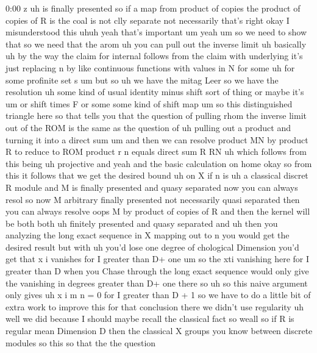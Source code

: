 \begin{unfinished}{0:00}
z
uh  is  finally
presented  so  if
a  map  from  product  of  copies  the  product
of  copies  of  R  is  the  coal  is  not  clly
separate  not  necessarily  that's  right
okay  I  misunderstood  this  uhuh  yeah
that's  important  um
yeah
um  so  we  need  to  show  that  so  we  need
that  the
arom  uh  you  can  pull  out  the  inverse
limit  uh  basically  uh  by  the  way  the
claim  for  internal  follows  from  the
claim  with  underlying  it's  just
replacing  n  by  like  continuous  functions
with  values  in  N  for
some  uh  for  some  profinite  set  s  um  but
so  uh  we  have  the  mitag  Leer  so  we  have
the
resolution
uh  some  kind  of  usual  identity  minus
shift  sort  of  thing  or  maybe
it's  um  or  shift  times  F  or  some  some
kind  of  shift  map  um  so  this
distinguished  triangle  here  so  that
tells  you  that  the  question  of  pulling
rhom  the  inverse  limit  out  of  the  ROM  is
the  same  as  the  question  of  uh  pulling
out  a  product  and  turning  it  into  a
direct  sum  um  and  then  we  can
resolve  product  MN  by  product
R  to
reduce  to
ROM  product  r  n  equals  direct  sum
R
RN  uh  which  follows  from  this
being  uh  projective  and  yeah  and  the
basic  calculation  on
home
okay  so  from  this  it  follows  that  we  get
the  desired  bound  uh  on  X  if  n
is  uh  a  classical  discret  R  module  and  M
is  finally  presented  and  quasy
separated
now  you  can  always  resol  so  now  M
arbitrary  finally  presented  not
necessarily
quasi  separated  then  you  can  always
resolve  oops
M  by  product  of  copies  of  R  and  then  the
kernel  will  be  both  both  uh  finitely
presented  and  quasy
separated  and  uh  then  you  analyzing  the
long  exact  sequence  in  X  mapping  out  to
n  you  would  get  the  desired  result  but
with  uh  you'd  lose  one  degree  of
chological  Dimension  you'd  get  that  x  i
vanishes  for  I  greater  than  D+
one  um  so  the  xti  vanishing  here  for  I
greater  than  D  when  you  Chase  through
the  long  exact  sequence  would  only  give
the  vanishing  in  degrees  greater  than  D+
one  there
so  uh  so  this  naive
argument  only
gives  uh  x  i  m  n  =  0  for  I  greater  than
D  +
1  so  we  have  to  do  a  little  bit  of  extra
work  to  improve  this  for  that  conclusion
there  we  didn't  use
regularity  uh  well  we  did  because  I
should  maybe  recall  the  classical  fact
so
weall  so  if  R  is  regular
mean  Dimension  D  then  the  classical  X
groups  you  know  between  discrete
modules  so  this  so  that  the  the  question

\end{unfinished}
